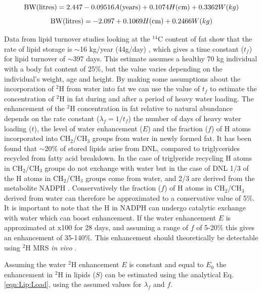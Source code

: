 \begin{equation}
    \textrm{BW(litres)} = 2.447-0.09516A\textrm{(years)}+0.1074H\textrm{(cm)}+0.3362W\textrm({kg})
    \label{eqn:Lip:male}
\end{equation}
\begin{equation}
    \textrm{BW(litres)} = -2.097+0.1069H\textrm{(cm)}+0.2466W\textrm({kg})
    \label{eqn:Lip:female}
\end{equation}

Data from lipid turnover studies looking at the $^{14}$C content of fat show that the rate of lipid storage is $\sim$16 kg/year (44g/day) \cite{Arner2011DynamicsDisease, Spalding2017ImpactTissue}, which gives a time constant ($t_f$) for lipid turnover of $\sim$397 days. This estimate assumes a healthy 70 kg individual with a body fat content of 25\%, but the value varies depending on the individual's weight, age and height. By making some assumptions about the incorporation of $^2$H from water into fat we can use the value of $t_f$ to estimate the concentration of $^2$H in fat during and after a period of heavy water loading. The enhancement of the $^2$H concentration in fat relative to natural abundance depends on the rate constant ($\lambda_f = 1/t_f$) the number of days of heavy water loading ($t$), the level of water enhancement ($E$) and the fraction ($f$) of H atoms incorporated into CH$_2$/CH$_3$ groups from water in newly formed fat. It has been found that $\sim$20\% of stored lipids arise from \ac{DNL}, compared to triglycerides recycled from fatty acid breakdown. In the case of triglyeride recycling H atoms in CH$_2$/CH$_3$ groups do not exchange with water but in the case of \ac{DNL} 1/3 of the H atoms in CH$_2$/CH$_3$ groups come from water, and 2/3 are derived from the metabolite NADPH \cite{Zhang2017ChemicalNADPH}. Conservatively the fraction ($f$) of H atoms in CH$_2$/CH$_3$ derived from water can therefore be approximated to a conservative value of 5\%. It is important to note that the H in NADPH can undergo catalytic exchange with water which can boost enhancement. If the water enhancement $E$ is approximated at x100 for 28 days, and assuming a range of $f$ of 5-20\% this gives an enhancement of 35-140\%. This enhancement should theoretically be detectable using $^2$H MRS \textit{in vivo} \cite{Brereton1986PreliminarySpectroscopy}. 

Assuming the water $^2$H enhancement $E$ is constant and equal to $E_0$ the enhancement in $^2$H in lipids ($S$) can be estimated using the analytical Eq. \ref{eqn:Lip:Load}, using the assumed values for $\lambda_f$ and $f$. 

